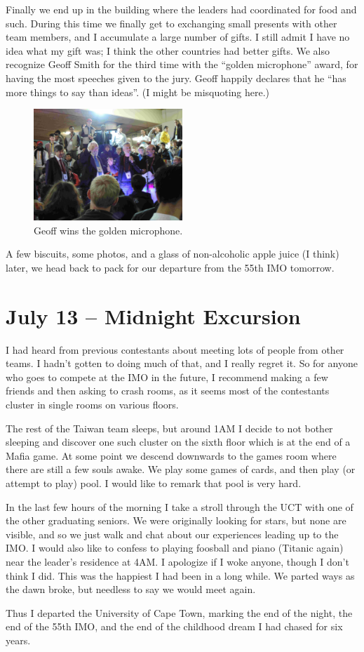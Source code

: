\documentclass[11pt]{scrreprt}
\numberwithin{figure}{chapter}
\begin{document}
Finally we end up in the building where the leaders had coordinated for food and such.
During this time we finally get to exchanging small presents with other team members, and I accumulate a large
number of gifts. I still admit I have no idea what my gift was; I think the other countries had better gifts.
We also recognize Geoff Smith for the third time with the ``golden microphone'' award, for having
the most speeches given to the jury. Geoff happily declares that he ``has more things to say than ideas''.
(I might be misquoting here.)

\begin{figure}[ht]
  \centering
  \includegraphics[width=0.5\textwidth]{media/geoff.jpg}
  \caption{Geoff wins the golden microphone.}
\end{figure}

A few biscuits, some photos, and a glass of non-alcoholic apple juice (I think) later, we head back
to pack for our departure from the 55th IMO tomorrow.

\section{July 13 -- Midnight Excursion}
I had heard from previous contestants about meeting lots of people from other teams.
I hadn't gotten to doing much of that, and I really regret it. So for anyone who
goes to compete at the IMO in the future, I recommend making a few friends and then asking
to crash rooms, as it seems most of the contestants cluster in single rooms on various floors.

The rest of the Taiwan team sleeps, but around 1AM I decide to not bother sleeping and discover one such
cluster on the sixth floor which is at the end of a Mafia game.
At some point we descend downwards to the games room where there are still
a few souls awake. We play some games of cards, and then play (or attempt to play) pool.
I would like to remark that pool is very hard.

In the last few hours of the morning I take a stroll through the UCT with one of the other graduating seniors.
We were originally looking for stars, but none are visible, and so we just walk and chat about our experiences
leading up to the IMO.
I would also like to confess to playing foosball and piano (Titanic again) near the leader's residence at 4AM.
I apologize if I woke anyone, though I don't think I did.
This was the happiest I had been in a long while.
We parted ways as the dawn broke, but needless to say we would meet again.

Thus I departed the University of Cape Town, marking the end of the night, the end of the 55th IMO,
and the end of the childhood dream I had chased for six years.
\end{document}
